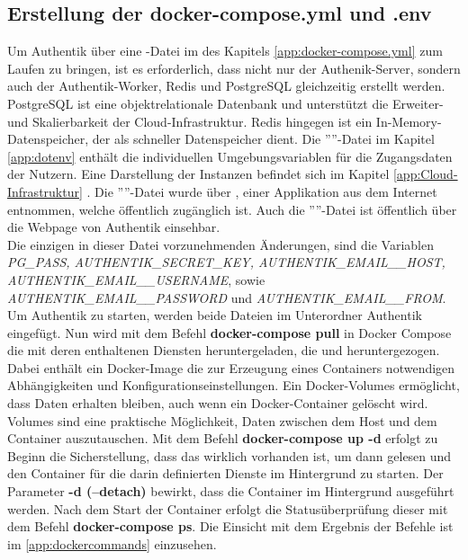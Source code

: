 \subsection{Erstellung der docker-compose.yml und .env}
\label{sec:Erstellung der docker-compose.yml .env}
Um Authentik über eine \textit{}-Datei im  des Kapitels \ref{app:docker-compose.yml} 
zum Laufen zu bringen, ist es erforderlich, dass nicht nur der Authenik-Server, sondern auch der Authentik-Worker, 
Redis und PostgreSQL gleichzeitig erstellt werden. PostgreSQL ist eine objektrelationale Datenbank und unterstützt 
die Erweiter- und Skalierbarkeit der Cloud-Infrastruktur. Redis hingegen ist ein In-Memory-Datenspeicher, der als 
schneller Datenspeicher dient. Die ''''-Datei im Kapitel \ref{app:dotenv}  
enthält die individuellen Umgebungsvariablen für die Zugangsdaten der Nutzern. 
Eine Darstellung der Instanzen befindet sich im Kapitel \ref{app:Cloud-Infrastruktur} . 
Die ''''-Datei wurde über \cite{Composerize}, einer 
Applikation aus dem Internet entnommen, welche öffentlich zugänglich ist. Auch die ''''-Datei ist öffentlich über die 
Webpage von Authentik einsehbar. 
\\Die einzigen in dieser Datei vorzunehmenden Änderungen, sind die Variablen 
\textit{PG\_PASS, AUTHENTIK\_SECRET\_KEY, AUTHENTIK\_EMAIL\_\_HOST, AUTHENTIK\_EMAIL\_\_USERNAME}, sowie \textit{AUTHENTIK\_EMAIL\_\_PASSWORD} 
und \textit{AUTHENTIK\_EMAIL\_\_FROM}. 
Um Authentik zu starten, werden beide Dateien im Unterordner Authentik eingefügt. Nun wird mit dem Befehl 
\textbf{docker-compose pull} in Docker Compose die \textbf{} mit deren enthaltenen Diensten heruntergeladen, 
die \cite{Images} und \cite{Volumes} heruntergezogen. Dabei enthält ein Docker-Image die zur Erzeugung eines Containers notwendigen Abhängigkeiten 
und Konfigurationseinstellungen. 
Ein Docker-Volumes ermöglicht, dass Daten erhalten bleiben, auch wenn ein Docker-Container gelöscht wird. 
Volumes sind eine praktische Möglichkeit, Daten zwischen dem Host und dem Container auszutauschen.
Mit dem Befehl \textbf{docker-compose up -d} erfolgt zu Beginn die Sicherstellung, dass das 
 wirklich vorhanden ist, um dann gelesen und den Container für die darin definierten Dienste im Hintergrund zu starten. Der 
Parameter \textbf{-d (--detach)} bewirkt, dass die Container im Hintergrund ausgeführt werden. Nach dem Start der Container erfolgt die Statusüberprüfung dieser 
mit dem Befehl \textbf{docker-compose ps}. Die Einsicht mit dem Ergebnis der Befehle ist im  \ref{app:dockercommands} 
 einzusehen.

